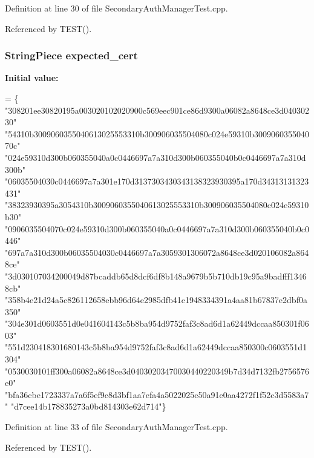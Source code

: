 Definition at line 30 of file Secondary\+Auth\+Manager\+Test.\+cpp.



Referenced by T\+E\+S\+T().

\subsubsection[{expected\+\_\+cert}]{\setlength{\rightskip}{0pt plus 5cm}String\+Piece expected\+\_\+cert}\label{SecondaryAuthManagerTest_8cpp_ab4ac7ffd522bc686dd08d30fca48fd95}
{\bfseries Initial value\+:}
\begin{DoxyCode}
= \{
    \textcolor{stringliteral}{"308201ee30820195a003020102020900c569eec901ce86d9300a06082a8648ce3d04030230"}
    \textcolor{stringliteral}{"54310b3009060355040613025553310b300906035504080c024e59310b300906035504070c"}
    \textcolor{stringliteral}{"024e59310d300b060355040a0c0446697a7a310d300b060355040b0c0446697a7a310d300b"}
    \textcolor{stringliteral}{"06035504030c0446697a7a301e170d3137303430343138323930395a170d34313131323431"}
    \textcolor{stringliteral}{"38323930395a3054310b3009060355040613025553310b300906035504080c024e59310b30"}
    \textcolor{stringliteral}{"0906035504070c024e59310d300b060355040a0c0446697a7a310d300b060355040b0c0446"}
    \textcolor{stringliteral}{"697a7a310d300b06035504030c0446697a7a3059301306072a8648ce3d020106082a8648ce"}
    \textcolor{stringliteral}{"3d030107034200049d87bcaddb65d8dcf6df8b148a9679b5b710db19c95a9badfff13468cb"}
    \textcolor{stringliteral}{"358b4e21d24a5c826112658ebb96d64e2985dfb41c1948334391a4aa81b67837e2dbf0a350"}
    \textcolor{stringliteral}{"304e301d0603551d0e041604143c5b8ba954d9752faf3c8ad6d1a62449dccaa850301f0603"}
    \textcolor{stringliteral}{"551d230418301680143c5b8ba954d9752faf3c8ad6d1a62449dccaa850300c0603551d1304"}
    \textcolor{stringliteral}{"0530030101ff300a06082a8648ce3d04030203470030440220349b7d34d7132fb2756576e0"}
    \textcolor{stringliteral}{"bfa36cbe1723337a7a6f5ef9c8d3bf1aa7efa4a5022025c50a91e0aa4272f1f52c3d5583a7"}
    \textcolor{stringliteral}{"d7cee14b178835273a0bd814303e62d714"}\}
\end{DoxyCode}


Definition at line 33 of file Secondary\+Auth\+Manager\+Test.\+cpp.



Referenced by T\+E\+S\+T().

